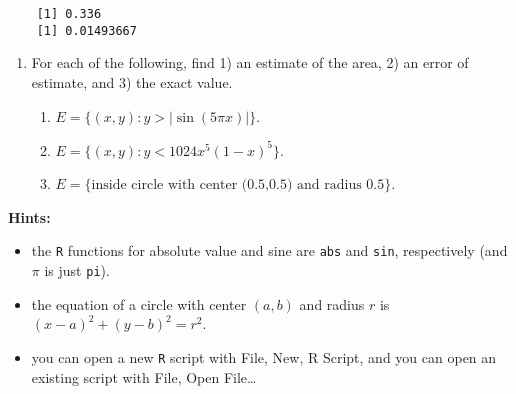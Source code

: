 \documentclass[10pt,english]{article}
\begin{document}
\begin{verbatim}
    [1] 0.336
    [1] 0.01493667
\end{verbatim}



\begin{enumerate}
\item For each of the following, find 1) an estimate of the area, 2) an error of estimate, and 3) the exact value.
\begin{enumerate}
\item \( E = \{ (x,y) : y > |\sin(5 \pi x)| \} \).
\item \( E = \{ (x,y) : y < 1024 x^5 (1-x)^5 \} \).
\item \( E = \{ \mbox{inside circle with center (0.5,0.5) and radius 0.5}\} \).
\end{enumerate}
\end{enumerate}
\textbf{Hints:}

\begin{itemize}
\item the \texttt{R} functions for absolute value and sine are \texttt{abs} and \texttt{sin}, respectively (and $\pi$ is just \texttt{pi}).
\item the equation of a circle with center \( (a,b) \) and radius $r$ is \( (x-a)^{2} + (y-b)^{2} = r^{2} \).
\item you can open a new \texttt{R} script with File, New, R Script, and you can open an existing script with File, Open File\ldots{}
\end{itemize}
\end{document}
